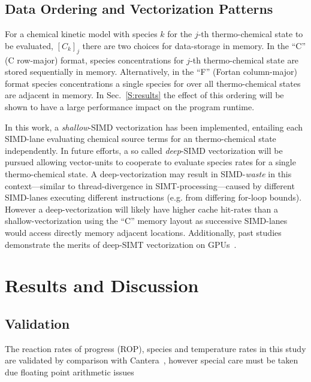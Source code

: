 \documentclass[12pt]{ussci}
\begin{document}
\subsection{Data Ordering and Vectorization Patterns}
For a chemical kinetic model with species $k$ for the $j$-th thermo-chemical state to be evaluated, $[C_k]_j$ there are two choices for data-storage in memory.
In the ``C'' (C row-major) format, species concentrations for $j$-th thermo-chemical state are stored sequentially in memory.
Alternatively, in the ``F'' (Fortan column-major) format species concentrations a single species for over all thermo-chemical states are adjacent in memory.
In Sec.~\ref{S:results} the effect of this ordering will be shown to have a large performance impact on the program runtime.

In this work, a \textit{shallow}-SIMD vectorization has been implemented, entailing each SIMD-lane evaluating chemical source terms for an thermo-chemical state independently.
In future efforts, a so called \textit{deep}-SIMD vectorization will be pursued allowing vector-units to cooperate to evaluate species rates for a single thermo-chemical state.
A deep-vectorization may result in SIMD-\textit{waste} in this context---similar to thread-divergence in SIMT-processing---caused by different SIMD-lanes executing different instructions (e.g. from differing for-loop bounds).
However a deep-vectorization will likely have higher cache hit-rates than a shallow-vectorization using the ``C'' memory layout as successive SIMD-lanes would access directly memory adjacent locations.
Additionally, past studies demonstrate the merits of deep-SIMT vectorization on GPUs~\cite{Sewerin20151375}.

\section{Results and Discussion}
\subsection{Validation}
The reaction rates of progress (ROP), species and temperature rates in this study are validated by comparison with Cantera~\cite{Cantera}, however special care must be taken due floating point arithmetic issues
\end{document}
